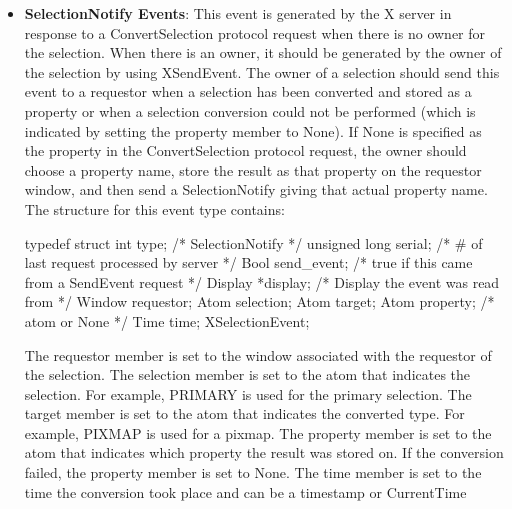 \documentclass{report}
\begin{document}
\begin{itemize}
        \item \textbf{SelectionNotify Events}: This event is generated by the X server in response to a ConvertSelection protocol request when there is no owner for the selection. When there is an owner, it should be generated by the owner of the selection by using XSendEvent. The owner of a selection should send this event to a requestor when a selection has been converted and stored as a property or when a selection conversion could not be performed (which is indicated by setting the property member to None).
            \bigbreak \noindent 
            If None is specified as the property in the ConvertSelection protocol request, the owner should choose a property name, store the result as that property on the requestor window, and then send a SelectionNotify giving that actual property name.
            \bigbreak \noindent 
            The structure for this event type contains:
            \bigbreak \noindent 
            \begin{cppcode}
                typedef struct {
                    int type;               /* SelectionNotify */
                    unsigned long serial;   /* # of last request processed by server */
                    Bool send_event;        /* true if this came from a SendEvent request */
                    Display *display;       /* Display the event was read from */
                    Window requestor;
                    Atom selection;
                    Atom target;
                    Atom property;          /* atom or None */
                    Time time;
                } XSelectionEvent;
            \end{cppcode}
            \bigbreak \noindent 
            The requestor member is set to the window associated with the requestor of the selection. The selection member is set to the atom that indicates the selection. For example, PRIMARY is used for the primary selection. The target member is set to the atom that indicates the converted type.
            \bigbreak \noindent 
            For example, PIXMAP is used for a pixmap. The property member is set to the atom that indicates which property the result was stored on. If the conversion failed, the property member is set to None. The time member is set to the time the conversion took place and can be a timestamp or CurrentTime


    \end{itemize}
\end{document}
